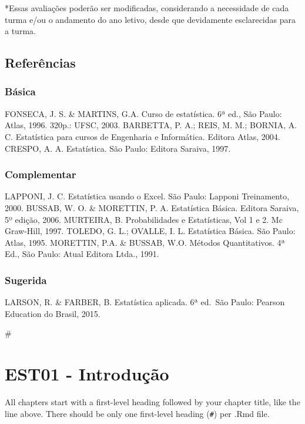 \documentclass[
]{book}
\begin{document}
*Essas avaliações poderão ser modificadas, considerando a necessidade de cada turma e/ou o andamento do ano letivo, desde que devidamente esclarecidas para a turma.

\hypertarget{referuxeancias}{%
\section{Referências}\label{referuxeancias}}

\hypertarget{buxe1sica}{%
\subsection{Básica}\label{buxe1sica}}

FONSECA, J. S. \& MARTINS, G.A. Curso de estatística. 6ª ed., São Paulo: Atlas, 1996. 320p.: UFSC, 2003.
BARBETTA, P. A.; REIS, M. M.; BORNIA, A. C. Estatística para cursos de Engenharia e Informática. Editora Atlas, 2004.
CRESPO, A. A. Estatística. São Paulo: Editora Saraiva, 1997.

\hypertarget{complementar}{%
\subsection{Complementar}\label{complementar}}

LAPPONI, J. C. Estatística usando o Excel. São Paulo: Lapponi Treinamento, 2000.
BUSSAB, W. O. \& MORETTIN, P. A. Estatística Básica. Editora Saraiva, 5º edição, 2006.
MURTEIRA, B. Probabilidades e Estatísticas, Vol 1 e 2. Mc Graw-Hill, 1997.
TOLEDO, G. L.; OVALLE, I. L. Estatística Básica. São Paulo: Atlas, 1995.
MORETTIN, P.A. \& BUSSAB, W.O. Métodos Quantitativos. 4ª Ed., São Paulo: Atual Editora Ltda., 1991.

\hypertarget{sugerida}{%
\subsection{Sugerida}\label{sugerida}}

LARSON, R. \& FARBER, B. Estatística aplicada. 6ª ed.~São Paulo: Pearson Education do Brasil, 2015.

\#\citep{barbetta2004estatistica}

\hypertarget{est01---introduuxe7uxe3o}{%
\chapter{EST01 - Introdução}\label{est01---introduuxe7uxe3o}}

All chapters start with a first-level heading followed by your chapter title, like the line above. There should be only one first-level heading (\texttt{\#}) per .Rmd file.
\end{document}
